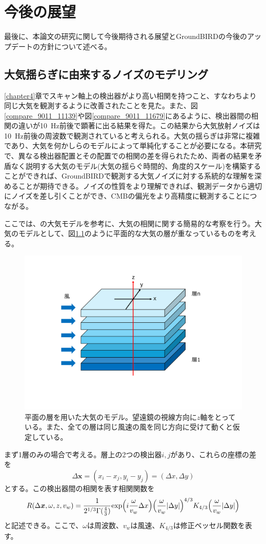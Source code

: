 \chapter{今後の展望}
\label{chapter5}
最後に、本論文の研究に関して今後期待される展望とGroundBIRDの今後のアップデートの方針について述べる。
\section{大気揺らぎに由来するノイズのモデリング}
\label{atmos_model}
\ref{chapter4}章でスキャン軸上の検出器がより高い相関を持つこと、すなわちより同じ大気を観測するように改善されたことを見た。また、図\ref{compare_9011_11139}や図\ref{compare_9011_11679}にあるように、検出器間の相関の違いが\SI{10}{Hz}前後で顕著に出る結果を得た。この結果から大気放射ノイズは\SI{10}{Hz}前後の周波数で観測されていると考えられる。大気の揺らぎは非常に複雑であり、大気を何かしらのモデルによって単純化することが必要になる。本研究で、異なる検出器配置とその配置での相関の差を得られたため、両者の結果を矛盾なく説明する大気のモデル(大気の揺らぐ時間的、角度的スケール)を構築することができれば、GroundBIRDで観測する大気ノイズに対する系統的な理解を深めることが期待できる。ノイズの性質をより理解できれば、観測データから適切にノイズを差し引くことができ、CMBの偏光をより高精度に観測することにつながる。

ここでは、\cite{nishinomiya}の大気モデルを参考に、大気の相関に関する簡易的な考察を行う。大気のモデルとして、図\ref{atmos_layer}のように平面的な大気の層が重なっているものを考える。

\begin{figure}[htbp]
  \centering
  \includegraphics[width=0.7\columnwidth]{6_prospect/figs/atmos_layer.pdf}
  \caption{平面の層を用いた大気のモデル。望遠鏡の視線方向に$z$軸をとっている。また、全ての層は同じ風速の風を同じ方向に受けて動くと仮定している。}
  \label{atmos_layer}
\end{figure}
まず1層のみの場合で考える。層上の2つの検出器$i, j$があり、これらの座標の差を
\begin{equation}
  \Delta\bm{x} = (x_{i} -x_{j}, y_{i} - y_{j}) = (\Delta x, \Delta y)
\end{equation}
とする。この検出器間の相関を表す相関関数を
\begin{equation}
  R(\Delta\bm{x},\omega,z, v_{w}) = \frac{1}{2^{1/3}\Gamma(\frac{4}{3})}\mathrm{exp}\Bigl(i\frac{\omega}{v_{w}}\Delta x\Bigr)\Bigl(\frac{\omega}{v_{w}}|\Delta y|\Bigr)^{4/3}K_{4/3}\Bigl(\frac{\omega}{v_{w}}|\Delta y|\Bigr)
\end{equation}
と記述できる。ここで、$\omega$は周波数、$v_{w}$は風速、$K_{4/3}$は修正ベッセル関数を表す。


